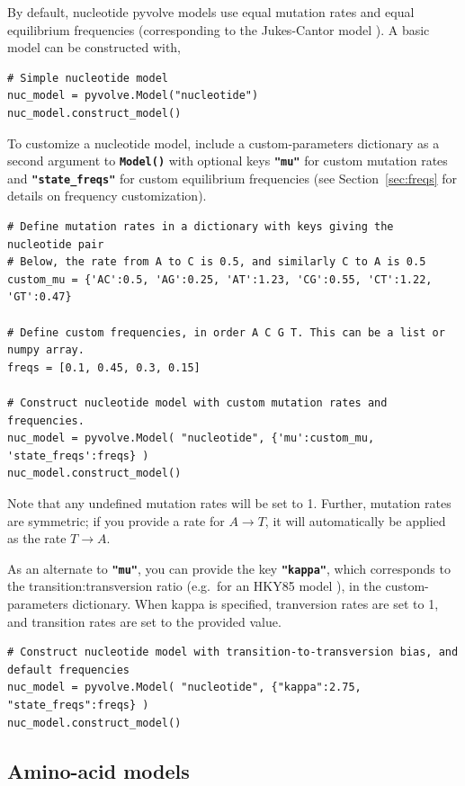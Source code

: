 \documentclass{article}
\newcommand{\code}[1]{\textbf{\texttt{\small{#1}}}}
\begin{document}
By default, nucleotide pyvolve models use equal mutation rates and equal equilibrium frequencies (corresponding to the Jukes-Cantor model \citep{JC69}). A basic model can be constructed with, 
\begin{lstlisting}
# Simple nucleotide model 
nuc_model = pyvolve.Model("nucleotide")
nuc_model.construct_model()
\end{lstlisting}

To customize a nucleotide model, include a custom-parameters dictionary as a second argument to \code{Model()} with optional keys \code{"mu"} for custom mutation rates and \code{"state\_freqs"} for custom equilibrium frequencies (see Section~\ref{sec:freqs} for details on frequency customization). 
\begin{lstlisting}
# Define mutation rates in a dictionary with keys giving the nucleotide pair
# Below, the rate from A to C is 0.5, and similarly C to A is 0.5
custom_mu = {'AC':0.5, 'AG':0.25, 'AT':1.23, 'CG':0.55, 'CT':1.22, 'GT':0.47} 

# Define custom frequencies, in order A C G T. This can be a list or numpy array.
freqs = [0.1, 0.45, 0.3, 0.15]

# Construct nucleotide model with custom mutation rates and frequencies.
nuc_model = pyvolve.Model( "nucleotide", {'mu':custom_mu, 'state_freqs':freqs} )
nuc_model.construct_model()
\end{lstlisting}
Note that any undefined mutation rates will be set to 1. Further, mutation rates are symmetric; if you provide a rate for $A \rightarrow T$, it will automatically be applied as the rate $T \rightarrow A$. 

As an alternate to \code{"mu"}, you can provide the key \code{"kappa"}, which corresponds to the transition:transversion ratio (e.g.\ for an HKY85  model \citep{HKY85}), in the custom-parameters dictionary. When kappa is specified, tranversion rates are set to 1, and transition rates are set to the provided value.

\begin{lstlisting}
# Construct nucleotide model with transition-to-transversion bias, and default frequencies
nuc_model = pyvolve.Model( "nucleotide", {"kappa":2.75, "state_freqs":freqs} )
nuc_model.construct_model()
\end{lstlisting}


\subsection{Amino-acid models}\label{sec:amino_basic}
\end{document}
